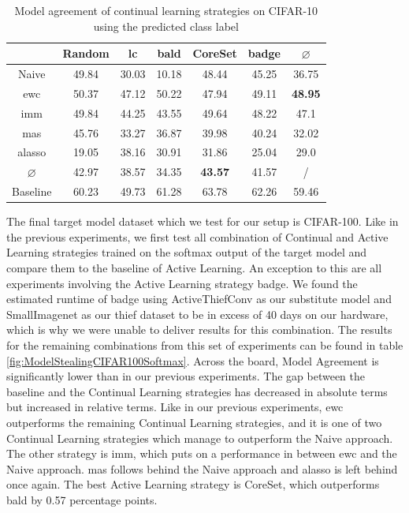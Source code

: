 \begin{table}[h]
    \centering
    \begin{tabular}{ c | c c c c c | c } 
         & Random & \gls{lc} & \gls{bald} & CoreSet & \gls{badge} & $\varnothing$\\ 
        \hline
        Naive & 49.84 & 30.03 & 10.18 & 48.44 & 45.25 & 36.75\\
        \gls{ewc} & 50.37 & 47.12 & 50.22 & 47.94 & 49.11 & \textbf{48.95} \\
        \gls{imm} & 49.84 & 44.25 & 43.55 & 49.64 & 48.22 & 47.1\\
        \gls{mas} & 45.76 & 33.27 & 36.87 & 39.98 & 40.24 & 32.02\\
        \gls{alasso} & 19.05 & 38.16 & 30.91 & 31.86 & 25.04 & 29.0\\
        \hline
        $\varnothing$ & 42.97 & 38.57 & 34.35 & \textbf{43.57} & 41.57 & /\\
        Baseline & 60.23 & 49.73 & 61.28 & 63.78 & 62.26 & 59.46\\
    \end{tabular}
    \caption{Model agreement of continual learning strategies on CIFAR-10 using the predicted class label}
    \label{fig:ModelStealingCIFAR10Label}
\end{table}

The final target model dataset which we test for our setup is CIFAR-100. Like in the previous experiments, we first test all combination of Continual and Active Learning strategies trained on the softmax output of the target model
and compare them to the baseline of Active Learning. An exception to this are all experiments involving the Active Learning strategy \gls{badge}. We found the estimated runtime of \gls{badge} using ActiveThiefConv as our substitute model and SmallImagenet as our thief dataset
to be in excess of 40 days on our hardware, which is why we were unable to deliver results for this combination. The results for the remaining combinations from this set of experiments can be found in table \ref{fig:ModelStealingCIFAR100Softmax}.
Across the board, Model Agreement is significantly lower than in our previous experiments. The gap between the baseline and the Continual Learning strategies has decreased in absolute terms but increased in relative terms. Like in our previous experiments, \gls{ewc} outperforms
the remaining Continual Learning strategies, and it is one of two Continual Learning strategies which manage to outperform the Naive approach. The other strategy is \gls{imm}, which puts on a performance in between \gls{ewc} and the Naive approach. \gls{mas} follows behind the Naive approach
and \gls{alasso} is left behind once again. The best Active Learning strategy is CoreSet, which outperforms \gls{bald} by 0.57 percentage points. \par

